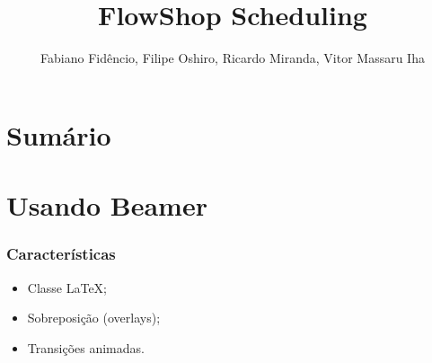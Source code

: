 \usepackage[brazil]{babel}
\usepackage[utf8]{inputenc}
\title{FlowShop Scheduling}
\author{Fabiano Fidêncio, Filipe Oshiro, Ricardo Miranda, Vitor Massaru Iha}

	\frame{\titlepage}
	\section{Sumário}
	\frame{\tableofcontents}
	\section{Usando Beamer}
	\frame
	{
		\frametitle{Características}
		\begin{itemize}
			\item<1-> Classe \LaTeX;
			\item<2-> Sobreposição (overlays);
			\item<3-> Transições animadas.
		\end{itemize}
	}


